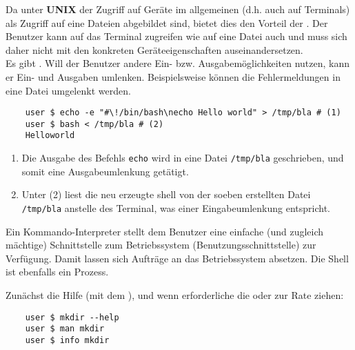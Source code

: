 \begin{answer}
  Da unter \textbf{UNIX} der Zugriff auf Geräte im allgemeinen (d.h. auch auf Terminals) als Zugriff auf eine Dateien abgebildet sind, bietet dies den Vorteil der . Der Benutzer
  kann auf das Terminal zugreifen wie auf eine Datei auch und muss sich daher nicht mit den konkreten Geräteeigenschaften auseinandersetzen. \\
  Es gibt . Will der Benutzer andere Ein- bzw. Ausgabemöglichkeiten nutzen, kann er Ein- und Ausgaben umlenken. Beispielsweise können die Fehlermeldungen in eine Datei umgelenkt werden.

  \begin{lstlisting}
    user $ echo -e "#\!/bin/bash\necho Hello world" > /tmp/bla # (1)
    user $ bash < /tmp/bla # (2)
    Helloworld
  \end{lstlisting}

  \begin{enumerate}
  \item Die Ausgabe des Befehls \texttt{echo} wird in eine Datei \texttt{/tmp/bla} geschrieben, und somit eine Ausgabeumlenkung getätigt.

  \item Unter (2) liest die neu erzeugte shell von der soeben erstellten Datei \texttt{/tmp/bla} anstelle des Terminal, was einer Eingabeumlenkung entspricht.
  \end{enumerate}

\end{answer}

\begin{answer}
  Ein Kommando-Interpreter stellt dem Benutzer eine einfache (und zugleich mächtige) Schnittstelle zum Betriebssystem \crucial({Benutzungsschnittstelle}) zur Verfügung. Damit lassen sich Aufträge an das Betriebssystem absetzen. Die Shell ist ebenfalls ein Prozess.
\end{answer}

\begin{answer}
  Zunächst die Hilfe (mit dem ), und wenn erforderliche die  oder  zur Rate ziehen:
  \begin{lstlisting}
    user $ mkdir --help
    user $ man mkdir
    user $ info mkdir
  \end{lstlisting}
\end{answer}


